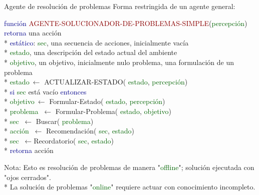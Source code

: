
\begin{frame}{Agente de resolución de problemas}
Forma restringida de un agente general:

\begin{theorem}[Pseudocódigo]

\begin{listing}
{\scriptsize 
\textcolor{darkblue}{función} \textcolor{darkred}{AGENTE-SOLUCIONADOR-DE-PROBLEMAS-SIMPLE}(\textcolor{darkgreen}{percepción}) 
\textcolor{darkblue}{retorna} una acción
\\* \quad\quad
\textcolor{darkblue}{estático}: 
\textcolor{darkgreen}{sec}, una secuencia de acciones, inicialmente vacía
\\* \quad\quad\quad\quad\quad\quad
\textcolor{darkgreen}{estado}, una descripción del estado actual del ambiente
\\* \quad\quad\quad\quad\quad\quad
\textcolor{darkgreen}{objetivo}, un objetivo, inicialmente nulo
		  problema, una formulación de un problema
\\* \quad\quad
\textcolor{darkgreen}{estado}$\ \leftarrow $ {ACTUALIZAR-ESTADO}(
\textcolor{darkgreen}{estado}, 
\textcolor{darkgreen}{percepción})
\\*\quad\quad
\textcolor{darkblue}{si} 
\textcolor{darkgreen}{sec} está vacío 
\textcolor{darkblue}{entonces} 
\\*\quad\quad\quad\quad
\textcolor{darkgreen}{objetivo}$\ \leftarrow $ Formular-Estado(
\textcolor{darkgreen}{estado}, 
\textcolor{darkgreen}{percepción})
\\*\quad\quad\quad\quad
\textcolor{darkgreen}{problema} $\ \leftarrow $ Formular-Problema(
\textcolor{darkgreen}{estado}, 
\textcolor{darkgreen}{objetivo})\\*
\quad\quad\quad\quad
\textcolor{darkgreen}{sec} $\ \leftarrow $ Buscar(
\textcolor{darkgreen}{problema})\\*
\quad\quad
\textcolor{darkgreen}{acción} $\ \leftarrow $ Recomendación(
\textcolor{darkgreen}{sec}, 
\textcolor{darkgreen}{estado})\\*
\quad\quad
\textcolor{darkgreen}{sec} $\ \leftarrow $Recordatorio(
\textcolor{darkgreen}{sec}, 
\textcolor{darkgreen}{estado})\\*
\quad\quad
\textcolor{darkblue}{retorna} acción
}
\end{listing}

\end{theorem}

{\tiny 
\quad\quad\quad Nota: Esto es resolución de problemas de manera "\textcolor{darkgreen}{offline}"; solución ejecutada con "ojos cerrados".
\\*\quad\quad\quad
La solución de problemas 
"\textcolor{darkgreen}{online}" requiere actuar con conocimiento incompleto.}

\end{frame}

